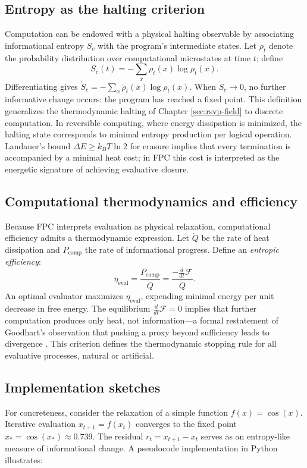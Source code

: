 \documentclass[12pt,a4paper]{article}
\newcommand{\ddt}{\tfrac{d}{dt}}      %
\theoremstyle{plain}
\begin{document}
\subsection{Entropy as the halting criterion}
Computation can be endowed with a physical halting observable by associating informational entropy \(S_c\) with the program’s intermediate states.
Let \(\rho_t\) denote the probability distribution over computational microstates at time \(t\);
define
\begin{equation}
S_c(t) = -\sum_x \rho_t(x)\log \rho_t(x).
\end{equation}
Differentiating gives
\(\dot{S}_c = -\sum_x \dot{\rho}_t(x)\log \rho_t(x)\).
When \(\dot{S}_c\to0\), no further informative change occurs: the program has reached a fixed point.
This definition generalizes the thermodynamic halting of Chapter \ref{sec:rsvp-field} to discrete computation.
In reversible computing, where energy dissipation is minimized, the halting state corresponds to minimal entropy production per logical operation.
Landauer’s bound \(\Delta E \ge k_B T\ln2\) for erasure implies that every termination is accompanied by a minimal heat cost;
in FPC this cost is interpreted as the energetic signature of achieving evaluative closure.

\subsection{Computational thermodynamics and efficiency}
Because FPC interprets evaluation as physical relaxation, computational efficiency admits a thermodynamic expression.
Let \(\dot{Q}\) be the rate of heat dissipation and \(P_{\text{comp}}\) the rate of informational progress.
Define an \emph{entropic efficiency}:
\[
\eta_{\text{eval}} = 
  \frac{P_{\text{comp}}}{\dot{Q}} 
  = \frac{-\ddt \mathcal{F}}{\dot{Q}}.
\]
An optimal evaluator maximizes \(\eta_{\text{eval}}\), expending minimal energy per unit decrease in free energy.
The equilibrium \(\ddt\mathcal{F}=0\) implies that further computation produces only heat, not information---a formal restatement of Goodhart’s observation that pushing a proxy beyond sufficiency leads to divergence \citep{goodhart1975problems}.
This criterion defines the thermodynamic stopping rule for all evaluative processes, natural or artificial.

\subsection{Implementation sketches}
For concreteness, consider the relaxation of a simple function \(f(x)=\cos(x)\).
Iterative evaluation \(x_{t+1}=f(x_t)\) converges to the fixed point \(x_*=\cos(x_*)\approx0.739\).
The residual \(r_t=x_{t+1}-x_t\) serves as an entropy-like measure of informational change.
A pseudocode implementation in Python illustrates:
\end{document}
